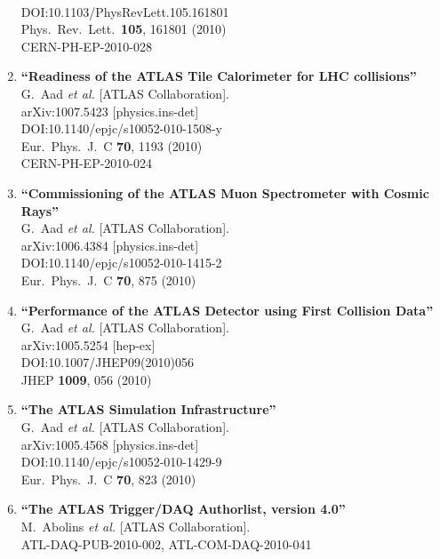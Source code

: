 \documentclass{article}
\begin{document}
\begin{enumerate}
  \\{}DOI:10.1103/PhysRevLett.105.161801
  \\{}Phys.\ Rev.\ Lett.\  {\bf 105}, 161801 (2010)
  \\{}CERN-PH-EP-2010-028
\item%
{\bf ``Readiness of the ATLAS Tile Calorimeter for LHC collisions''}
  \\{}G.~Aad {\it et al.} [ATLAS Collaboration].
  \\{}arXiv:1007.5423 [physics.ins-det]
  \\{}DOI:10.1140/epjc/s10052-010-1508-y
  \\{}Eur.\ Phys.\ J.\ C {\bf 70}, 1193 (2010)
  \\{}CERN-PH-EP-2010-024
\item%
{\bf ``Commissioning of the ATLAS Muon Spectrometer with Cosmic Rays''}
  \\{}G.~Aad {\it et al.} [ATLAS Collaboration].
  \\{}arXiv:1006.4384 [physics.ins-det]
  \\{}DOI:10.1140/epjc/s10052-010-1415-2
  \\{}Eur.\ Phys.\ J.\ C {\bf 70}, 875 (2010)
\item%
{\bf ``Performance of the ATLAS Detector using First Collision Data''}
  \\{}G.~Aad {\it et al.} [ATLAS Collaboration].
  \\{}arXiv:1005.5254 [hep-ex]
  \\{}DOI:10.1007/JHEP09(2010)056
  \\{}JHEP {\bf 1009}, 056 (2010)
\item%
{\bf ``The ATLAS Simulation Infrastructure''}
  \\{}G.~Aad {\it et al.} [ATLAS Collaboration].
  \\{}arXiv:1005.4568 [physics.ins-det]
  \\{}DOI:10.1140/epjc/s10052-010-1429-9
  \\{}Eur.\ Phys.\ J.\ C {\bf 70}, 823 (2010)
\item%
{\bf ``The ATLAS Trigger/DAQ Authorlist, version 4.0''}
  \\{}M.~Abolins {\it et al.} [ATLAS Collaboration].
  \\{}ATL-DAQ-PUB-2010-002, ATL-COM-DAQ-2010-041


\end{enumerate}
\end{document}
